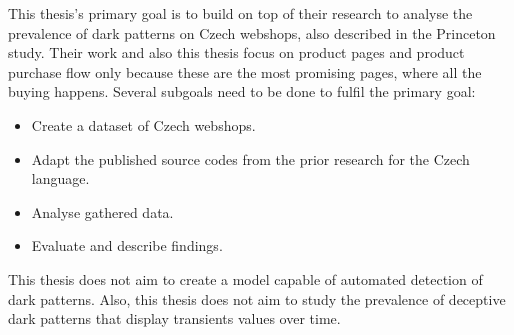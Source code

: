 This thesis's primary goal is to build on top of their research to analyse the prevalence of dark patterns on Czech webshops, also described in the Princeton study\cite{dark-patterns-at-scale}. Their work and also this thesis focus on product pages and product purchase flow only because these are the most promising pages, where all the buying happens. Several subgoals need to be done to fulfil the primary goal:
\begin{itemize}
    \item Create a dataset of Czech webshops.
    \item Adapt the published source codes from the prior research for the Czech language.
    \item Analyse gathered data.
    \item Evaluate and describe findings.
\end{itemize}

This thesis does not aim to create a model capable of automated detection of dark patterns. Also, this thesis does not aim to study the prevalence of deceptive dark patterns that display transients values over time.